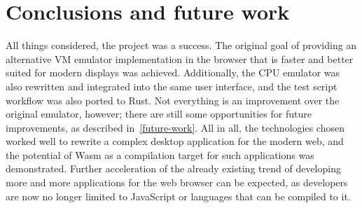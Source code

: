 \section{Conclusions and future work}
All things considered, the project was a success. The original goal of providing an alternative VM emulator implementation in the browser that is faster and better suited for modern displays was achieved.
Additionally, the CPU emulator was also rewritten and integrated into the same user interface, and the test script workflow was also ported to Rust.
Not everything is an improvement over the original emulator, however; there are still some opportunities for future improvements, as described in~\cref{future-work}.
All in all, the technologies chosen worked well to rewrite a complex desktop application for the modern web, and the potential of Wasm as a compilation target for such applications was demonstrated.
Further acceleration of the already existing trend of developing more and more applications for the web browser can be expected, as developers are now no longer limited to JavaScript or languages that can be compiled to it.

